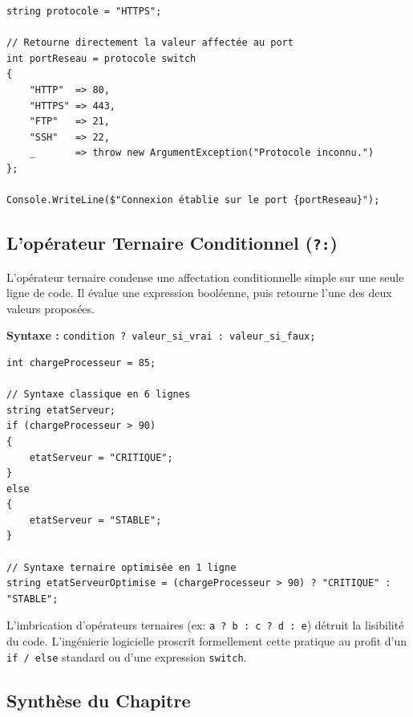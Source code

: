 \begin{lstlisting}[caption={Affectation via expression switch moderne}]
string protocole = "HTTPS";

// Retourne directement la valeur affectée au port
int portReseau = protocole switch
{
    "HTTP"  => 80,
    "HTTPS" => 443,
    "FTP"   => 21,
    "SSH"   => 22,
    _       => throw new ArgumentException("Protocole inconnu.")
};

Console.WriteLine($"Connexion établie sur le port {portReseau}");
\end{lstlisting}

\subsection{L'opérateur Ternaire Conditionnel (\texttt{?:})}

L'opérateur ternaire condense une affectation conditionnelle simple sur une seule ligne de code. Il évalue une expression booléenne, puis retourne l'une des deux valeurs proposées.

\textbf{Syntaxe :} \texttt{condition ? valeur\_si\_vrai : valeur\_si\_faux;}

\begin{lstlisting}[caption={Optimisation par opérateur ternaire}]
int chargeProcesseur = 85;

// Syntaxe classique en 6 lignes
string etatServeur;
if (chargeProcesseur > 90)
{
    etatServeur = "CRITIQUE";
}
else
{
    etatServeur = "STABLE";
}

// Syntaxe ternaire optimisée en 1 ligne
string etatServeurOptimise = (chargeProcesseur > 90) ? "CRITIQUE" : "STABLE";
\end{lstlisting}

\begin{tcolorbox}[colback=backcolour,colframe=stringcolor,title=\textbf{Anti-pattern : Les ternaires imbriqués}]
    L'imbrication d'opérateurs ternaires (ex: \texttt{a ? b : c ? d : e}) détruit la lisibilité du code. L'ingénierie logicielle proscrit formellement cette pratique au profit d'un \texttt{if / else} standard ou d'une expression \texttt{switch}.
\end{tcolorbox}

\subsection{Synthèse du Chapitre}

